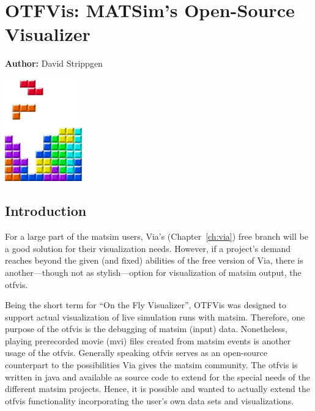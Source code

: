\chapter{OTFVis: MATSim's Open-Source Visualizer}
\label{ch:otfvis}

\hfill \textbf{Author:} David Strippgen

\begin{center} \includegraphics[width=0.25\textwidth, angle=0]{frontmatter/figures/MATSimBook} \end{center}


\section{Introduction}
For a large part of the \gls{matsim} users, Via's (Chapter~\ref{ch:via}) free branch will be a good solution for their visualization needs. However, if a project's demand reaches beyond the given (and fixed) abilities of the free version of Via, there is another---though not as stylish---option for visualization of \gls{matsim} output, the \gls{otfvis}. 

Being the short term for ``On the Fly Visualizer'', OTFVis was designed to support actual visualization of live simulation runs with \gls{matsim}. Therefore, one purpose of the \gls{otfvis} is the debugging of \gls{matsim} (input) data. Nonetheless, playing prerecorded movie (\gls{mvi}) files created from \gls{matsim} events is another usage of the \gls{otfvis}. Generally speaking \gls{otfvis} serves as an open-source counterpart to the possibilities Via gives the \gls{matsim} community. The \gls{otfvis} is written in \gls{java} and available as source code to extend for the special needs of the different \gls{matsim} projects. Hence, it is possible and wanted to actually extend the \gls{otfvis} functionality incorporating the user's own data sets and visualizations.


